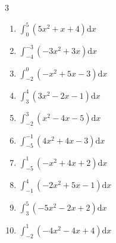 \begin{multicols}{3}
\begin{enumerate}
  \item $\displaystyle \int_{0}^{5}\left( 5x^{2}+x+4 \right) \mathrm{d}x$


  \item $\displaystyle \int_{-4}^{-3}\left( -3x^{2}+3x \right) \mathrm{d}x$


  \item $\displaystyle \int_{-2}^{0}\left( -x^{2}+5x-3 \right) \mathrm{d}x$


  \item $\displaystyle \int_{3}^{4}\left( 3x^{2}-2x-1 \right) \mathrm{d}x$


\columnbreak %

\resetques

  \item $\displaystyle \int_{-2}^{3}\left( x^{2}-4x-5 \right) \mathrm{d}x$


  \item $\displaystyle \int_{-5}^{-1}\left( 4x^{2}+4x-3 \right) \mathrm{d}x$


  \item $\displaystyle \int_{-5}^{1}\left( -x^{2}+4x+2 \right) \mathrm{d}x$

        \phantom{$\displaystyle =-88$}

  \item $\displaystyle \int_{-1}^{4}\left( -2x^{2}+5x-1 \right) \mathrm{d}x$


  \item $\displaystyle \int_{3}^{5}\left( -5x^{2}-2x+2 \right) \mathrm{d}x$


\columnbreak %

  \item $\displaystyle \int_{-2}^{1}\left( -4x^{2}-4x+4 \right) \mathrm{d}x$

        \phantom{$\displaystyle =-4$}


\end{enumerate}
\end{multicols}
